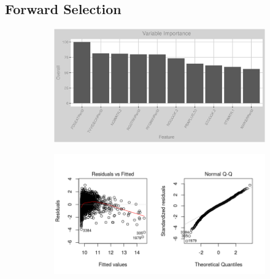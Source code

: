 \subsection{Forward Selection}
\label{appendix:natural_gas:lp}
\begin{figure}[h]
\centering
\begin{subfigure}{1\textwidth}
\centering
\includegraphics[width=.99\textwidth, height=0.35\textheight]{Images/natural_gas_psf_lp_vars.png}
\end{subfigure}
\begin{subfigure}{1\textwidth}
\centering
\includegraphics[width=.99\textwidth, height=0.4\textheight]{Images/natural_gas_psf_lp_res_1.png}
\end{subfigure}
\end{figure}
\FloatBarrier
\newpage
